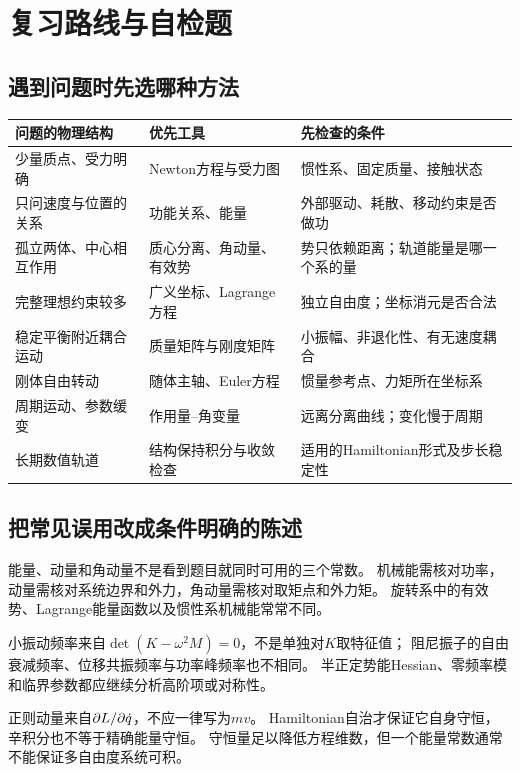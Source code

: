 \chapter{复习路线与自检题}

\section{遇到问题时先选哪种方法}
\begin{center}
\small
\begin{tabular}{p{}p{}p{}}
\hline
问题的物理结构 & 优先工具 & 先检查的条件\\
\hline
少量质点、受力明确 & Newton方程与受力图 & 惯性系、固定质量、接触状态\\
只问速度与位置的关系 & 功能关系、能量 & 外部驱动、耗散、移动约束是否做功\\
孤立两体、中心相互作用 & 质心分离、角动量、有效势 & 势只依赖距离；轨道能量是哪一个系的量\\
完整理想约束较多 & 广义坐标、Lagrange方程 & 独立自由度；坐标消元是否合法\\
稳定平衡附近耦合运动 & 质量矩阵与刚度矩阵 & 小振幅、非退化性、有无速度耦合\\
刚体自由转动 & 随体主轴、Euler方程 & 惯量参考点、力矩所在坐标系\\
周期运动、参数缓变 & 作用量--角变量 & 远离分离曲线；变化慢于周期\\
长期数值轨道 & 结构保持积分与收敛检查 & 适用的Hamiltonian形式及步长稳定性\\
\hline
\end{tabular}
\end{center}

\section{把常见误用改成条件明确的陈述}
能量、动量和角动量不是看到题目就同时可用的三个常数。
机械能需核对功率，动量需核对系统边界和外力，角动量需核对取矩点和外力矩。
旋转系中的有效势、Lagrange能量函数以及惯性系机械能常常不同。

小振动频率来自$\det(K - \omega^2M) = 0$，不是单独对$K$取特征值；
阻尼振子的自由衰减频率、位移共振频率与功率峰频率也不相同。
半正定势能Hessian、零频率模和临界参数都应继续分析高阶项或对称性。

正则动量来自$\partial L/\partial\dot q$，不应一律写为$mv$。
Hamiltonian自治才保证它自身守恒，辛积分也不等于精确能量守恒。
守恒量足以降低方程维数，但一个能量常数通常不能保证多自由度系统可积。

